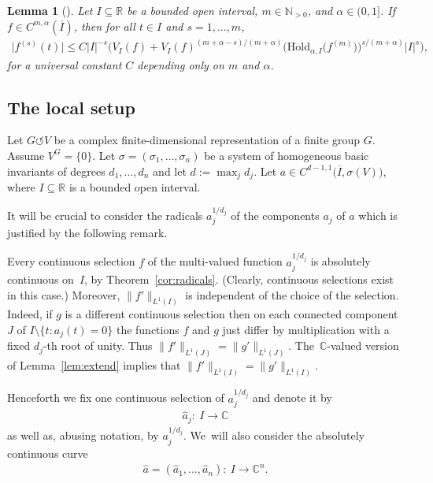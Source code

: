 \documentclass[pdftex]{sigma}
\numberwithin{equation}{section}
\newtheorem{Lemma}[Theorem]{Lemma}
\def\al{\alpha}
\def\si{\sigma}
\def\C{\mathbb{C}}
\def\N{\mathbb{N}}
\def\R{\mathbb{R}}
\def\ol{\overline}
\def\Hoeld{\on{H\ddot{o}ld}}
\def\we{\hat}
\def\acts{\circlearrowleft}
\let\on=\operatorname
\begin{document}
\begin{Lemma}[{\cite[Lemma 4]{ParusinskiRainer15}}] \label{taylor}
 Let $I \subseteq \R$ be a bounded open interval, $m \in \N_{>0}$, and $\al \in (0,1]$.
 If $f\in C^{m,\al}(\overline I)$, then for all $t\in I$
 and $s = 1,\dots,m$,
 \begin{gather*}
 \big|f^{(s)}(t) \big| \le C |I|^{-s} \bigl(V_I(f) + V_I(f)^{(m+\al-s)/(m+\al)} \big(\Hoeld_{\al,I}\big(f^{(m)}\big)\big)^{s/(m+\al)} |I|^s
 \bigr),
 \end{gather*}
 for a universal constant $C$ depending only on $m$ and $\al$.
\end{Lemma}

\subsection{The local setup}

Let $G \acts V$ be a complex finite-dimensional representation of a finite group $G$.
Assume $V^G = \{0\}$. Let $\si=(\si_1,\dots,\si_n)$ be a system of homogeneous basic invariants
of degrees $d_1,\dots, d_n$ and let $d := \max_j d_j$.
Let $a \in C^{d-1,1}\big(\ol I,\si(V)\big)$, where $I \subseteq \R$ is a bounded open interval.

It will be crucial to consider the radicals $a_j^{1/d_j}$ of the components $a_j$ of $a$ which is justified by the following remark.

\begin{Remark} \label{rem:notation}
Every continuous selection $f$ of
the multi-valued function $a_j^{1/d_j}$ is absolutely continuous on~$I$, by Theorem~\ref{cor:radicals}.
(Clearly, continuous selections exist in this case.)
Moreover, $\|f'\|_{L^1(I)}$ is independent of the
choice of the selection. Indeed, if $g$ is a different continuous selection then on each connected component $J$ of
$I \setminus \{t \colon a_j(t)=0\}$ the functions $f$ and $g$ just differ by multiplication with a fixed $d_j$-th root of unity.
Thus $\|f'\|_{L^1(J)} = \|g'\|_{L^1(J)}$. The~$\C$-valued version of Lemma~\ref{lem:extend} implies that $\|f'\|_{L^1(I)} = \|g'\|_{L^1(I)}$.

Henceforth we fix one continuous selection of $a_j^{1/d_j}$ and
denote it by
\begin{gather*}
 \we a_j \colon\ I \to \C
\end{gather*}
as well as, abusing notation, by $a_j^{1/d_j}$. We~will also consider the absolutely continuous curve
\begin{gather*}
 \we a = (\we a_1,\dots,\we a_n) \colon\ I \to \C^n.
\end{gather*}
\end{Remark}
\end{document}
